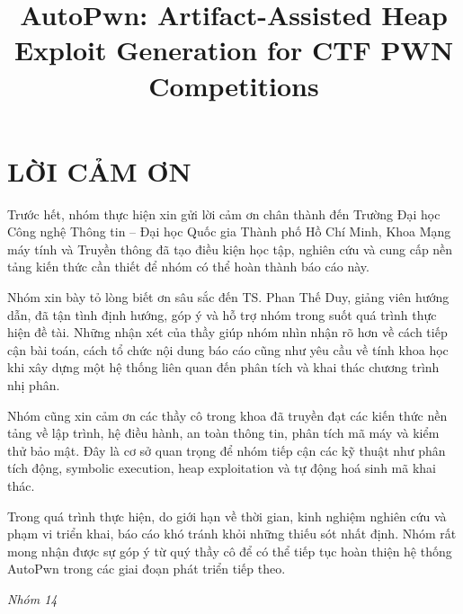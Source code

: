 \documentclass[final]{hcmuitthesis}
\title{AutoPwn: Artifact-Assisted Heap Exploit Generation for CTF PWN Competitions}
\begin{document}
\coverpage


\chapter*{LỜI CẢM ƠN}

Trước hết, nhóm thực hiện xin gửi lời cảm ơn chân thành đến Trường Đại học Công nghệ Thông tin -- Đại học Quốc gia Thành phố Hồ Chí Minh, Khoa Mạng máy tính và Truyền thông đã tạo điều kiện học tập, nghiên cứu và cung cấp nền tảng kiến thức cần thiết để nhóm có thể hoàn thành báo cáo này.

Nhóm xin bày tỏ lòng biết ơn sâu sắc đến TS. Phan Thế Duy, giảng viên hướng dẫn, đã tận tình định hướng, góp ý và hỗ trợ nhóm trong suốt quá trình thực hiện đề tài. Những nhận xét của thầy giúp nhóm nhìn nhận rõ hơn về cách tiếp cận bài toán, cách tổ chức nội dung báo cáo cũng như yêu cầu về tính khoa học khi xây dựng một hệ thống liên quan đến phân tích và khai thác chương trình nhị phân.

Nhóm cũng xin cảm ơn các thầy cô trong khoa đã truyền đạt các kiến thức nền tảng về lập trình, hệ điều hành, an toàn thông tin, phân tích mã máy và kiểm thử bảo mật. Đây là cơ sở quan trọng để nhóm tiếp cận các kỹ thuật như phân tích động, symbolic execution, heap exploitation và tự động hoá sinh mã khai thác.

Trong quá trình thực hiện, do giới hạn về thời gian, kinh nghiệm nghiên cứu và phạm vi triển khai, báo cáo khó tránh khỏi những thiếu sót nhất định. Nhóm rất mong nhận được sự góp ý từ quý thầy cô để có thể tiếp tục hoàn thiện hệ thống AutoPwn trong các giai đoạn phát triển tiếp theo.

\begin{flushright}
\textit{Nhóm 14}
\end{flushright}

\clearpage

\tableofcontents
\clearpage
\end{document}
